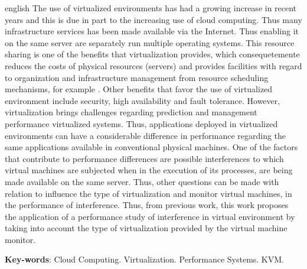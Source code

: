 \begin{resumo}[Abstract]
 \begin{otherlanguage*}{english}
The use of virtualized environments has had a growing increase in recent years and this is due in part to the increasing use of cloud computing. Thus many infrastructure services has been made available via the Internet. Thus enabling it on the same server are separately run multiple operating systems. This resource sharing is one of the benefits that virtualization provides, which consequetemente reduces the costs of physical resources (servers) and provides facilities with regard to organization and infrastructure management from resource scheduling mechanisms, for example . Other benefits that favor the use of virtualized environment include security, high availability and fault tolerance. However, virtualization brings challenges regarding prediction and management performance virtualized systems. Thus, applications deployed in virtualized environments can have a considerable difference in performance regarding the same applications available in conventional physical machines. One of the factors that contribute to performance differences are possible interferences to which virtual machines are subjected when in the execution of its processes, are being made available on the same server. Thus, other questions can be made with relation to influence the type of virtualization and monitor virtual machines, in the performance of interference. Thus, from previous work, this work proposes the application of a performance study of interference in virtual environment by taking into account the type of virtualization provided by the virtual machine monitor.






   \vspace{\onelineskip}
 
   \noindent 
   \textbf{Key-words}: Cloud Computing. Virtualization. Performance Systems. KVM.
 \end{otherlanguage*}
\end{resumo}
